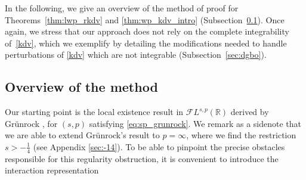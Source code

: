 \documentclass[%
11pt,  reqno]{amsart}
\newcommand{\5}{\textup{V}}
\newcommand{\noi}{\noindent}
\newtheorem{proposition}[theorem]{Proposition}
\theoremstyle{remark}
\newcommand{\R}{\mathbb{R}}
\numberwithin{equation}{section}
\numberwithin{theorem}{section}
\newcommand{\andreia}[1]{\marginpar{\color{purple} $\Leftarrow\Leftarrow\Leftarrow$}{\smallskip \noi\color{purple}ANDREIA: #1}\smallskip}
\begin{document}
{\color{red}
In the following, we give an overview of the method of proof for Theorems~\ref{thm:lwp_rkdv} and \ref{thm:wp_kdv_intro} (Subsection~\ref{SUBSEC:method}). 
Once again, we stress that our approach does not rely on the complete integrability of~\eqref{kdv}, which we exemplify by detailing the modifications needed to handle perturbations of \eqref{kdv} which are not integrable (Subsection~\ref{sec:dgbo}). 
}




\subsection{Overview of the method}
\label{SUBSEC:method}

\andreia{HERE}

	Our starting point is the local existence result in $\mathcal{F}L^{s,p}(\R)$ derived by Grünrock \cite{Grunrock_ldv_hier}, for $(s,p)$ satisfying \eqref{eq:sp_grunrock}. We remark as a sidenote that we are able to extend Grünrock's result to $p=\infty$, where we find the restriction $s>-\frac14$ (see Appendix \ref{sec:-14}).
	To be able to pinpoint the precise obstacles responsible for this regularity obstruction,  it is convenient to introduce the interaction representation \cite{Ginibre_interaction_rep}
\end{document}
